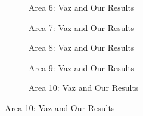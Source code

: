 \begin{figure}
	\ContinuedFloat
	\centering
	\begin{subfigure}{\textwidth}
		\centering
		\caption{ Area 6: Vaz \cite{vaz_object_based_dune_analysis} and Our Results }
		\label{fig:mixed_ml_grad_area6_results}
	\end{subfigure}
	\begin{subfigure}{\textwidth}
		\centering
		\caption{ Area 7: Vaz \cite{vaz_object_based_dune_analysis} and Our Results }
		\label{fig:mixed_ml_grad_area7_results}
	\end{subfigure}
	\begin{subfigure}{\textwidth}
		\centering
		\caption{ Area 8: Vaz \cite{vaz_object_based_dune_analysis} and Our Results }
		\label{fig:mixed_ml_grad_area8_results}
	\end{subfigure}
	\begin{subfigure}{\textwidth}
		\centering
		\caption{ Area 9: Vaz \cite{vaz_object_based_dune_analysis} and Our Results }
		\label{fig:mixed_ml_grad_area9_results}
	\end{subfigure}
	\begin{subfigure}{\textwidth}
		\centering
		\caption{ Area 10: Vaz \cite{vaz_object_based_dune_analysis} and Our Results }
		\label{fig:mixed_ml_grad_area10_results}
	\end{subfigure}
\end{figure}

